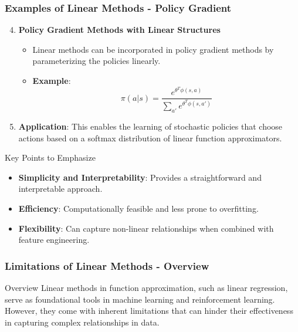 \documentclass[aspectratio=169]{beamer}
\begin{document}
\begin{frame}[fragile]
    \frametitle{Examples of Linear Methods - Policy Gradient}
    \begin{enumerate}
        \setcounter{enumi}{3}
        \item \textbf{Policy Gradient Methods with Linear Structures}
            \begin{itemize}
                \item Linear methods can be incorporated in policy gradient methods by parameterizing the policies linearly.
                \item \textbf{Example}:
                \begin{equation}
                \pi(a|s) = \frac{e^{\theta^T \phi(s, a)}}{\sum_{a'} e^{\theta^T \phi(s, a')}}
                \end{equation}
            \end{itemize}
            \item \textbf{Application}: This enables the learning of stochastic policies that choose actions based on a softmax distribution of linear function approximators.
    \end{enumerate}
    
    \vspace{1em}
    
    \begin{block}{Key Points to Emphasize}
        \begin{itemize}
            \item \textbf{Simplicity and Interpretability}: Provides a straightforward and interpretable approach.
            \item \textbf{Efficiency}: Computationally feasible and less prone to overfitting.
            \item \textbf{Flexibility}: Can capture non-linear relationships when combined with feature engineering.
        \end{itemize}
    \end{block}
\end{frame}

\begin{frame}[fragile]
    \frametitle{Limitations of Linear Methods - Overview}
    \begin{block}{Overview}
        Linear methods in function approximation, such as linear regression, serve as foundational tools in machine learning and reinforcement learning. 
        However, they come with inherent limitations that can hinder their effectiveness in capturing complex relationships in data.
    \end{block}
\end{frame}
\end{document}
